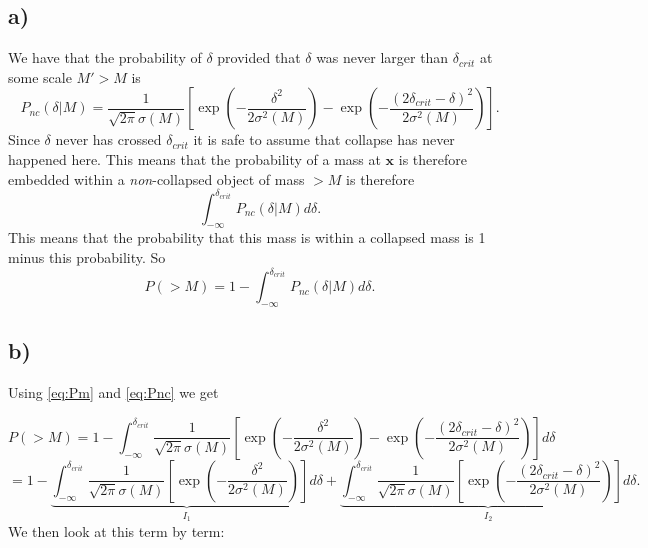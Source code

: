 \documentclass[a4paper,norsk, 10pt]{article}
\begin{document}
\subsection{a)}
We have that the probability of $\delta$ provided that $\delta$ was never larger than $\delta_{crit}$ at some scale $M' > M$ is
\begin{equation}\label{eq:Pnc}
P_{nc}(\delta|M) = \frac{1}{\sqrt{2\pi}\sigma(M)}\left[\exp\left(-\frac{\delta^2}{2\sigma^2 (M)}\right)-\exp\left(-\frac{(2\delta_{crit} - \delta)^2}{2\sigma^2 (M)}\right)\right].
\end{equation}
Since $\delta$ never has crossed $\delta_{crit}$ it is safe to assume that collapse has never happened here. This means that the probability of a mass at $\mathbf{x}$ is  therefore  embedded  within  a  \textit{non}-collapsed object of mass $>M$ is therefore
\begin{equation}
\int_{-\infty}^{\delta_{crit}} P_{nc}(\delta|M) d\delta.
\end{equation}
This means that the probability that this mass is within a collapsed mass is 1 minus this probability. So
\begin{equation}\label{eq:Pm}
P(>M) = 1 - \int_{-\infty}^{\delta_{crit}} P_{nc}(\delta|M) d\delta.
\end{equation}

\subsection{b)}
Using \eqref{eq:Pm} and \eqref{eq:Pnc} we get

\begin{equation}\label{eq:Pm}
P(>M) = 1 - \int_{-\infty}^{\delta_{crit}} \frac{1}{\sqrt{2\pi}\sigma(M)}\left[\exp\left(-\frac{\delta^2}{2\sigma^2 (M)}\right)-\exp\left(-\frac{(2\delta_{crit} - \delta)^2}{2\sigma^2 (M)}\right)\right] d\delta
\end{equation}
\begin{equation}
= 1 - \underbrace{\int_{-\infty}^{\delta_{crit}} \frac{1}{\sqrt{2\pi}\sigma(M)}\left[\exp\left(-\frac{\delta^2}{2\sigma^2 (M)}\right)\right]d\delta}_{I_1}+\underbrace{\int_{-\infty}^{\delta_{crit}} \frac{1}{\sqrt{2\pi}\sigma(M)}\left[\exp\left(-\frac{(2\delta_{crit} - \delta)^2}{2\sigma^2 (M)}\right)\right] d\delta}_{I_2}.
\end{equation}
We then look at this term by term:
\end{document}
